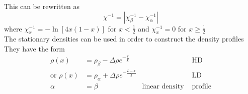 This can be rewritten as
\begin{equation*}
	\chi^{-1}=\left|\chi^{-1}_\beta-\chi^{-1}_\alpha\right|
\end{equation*}
where $\chi^{-1}_x=-\ln\left[4x(1-x)\right]$ for $x<\frac{1}{2}$ and $\chi^{-1}_x=0$ for $x\geq\frac{1}{2}$\\
The stationary densities can be used in order to construct the density profiles\\
They have the form
\begin{align*}
	\rho(x)&=\rho_\beta-\Delta\rho e^{-\frac{x}{\chi}} & &\text{HD}\\
	\text{or } \rho(x)&=\rho_\alpha+\Delta\rho e^{-\frac{L-x}{\chi}} & &\text{LD}\\
	\alpha&=\beta & \text{linear density }&\text{profile}
\end{align*}
